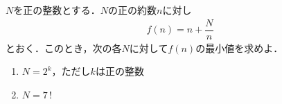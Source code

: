 \documentclass[../../main.tex]{subfiles}
\begin{document}
$N$を正の整数とする．$N$の正の約数$n$に対し
\begin{align*}
  f(n)=n+\dfrac{N}{n}
\end{align*}
とおく．このとき，次の各$N$に対して$f(n)$の最小値を求めよ．
\begin{enumerate}
  \item $N=2^k$，ただし$k$は正の整数
  \item $N=7 \, !$
\end{enumerate}
\end{document}
